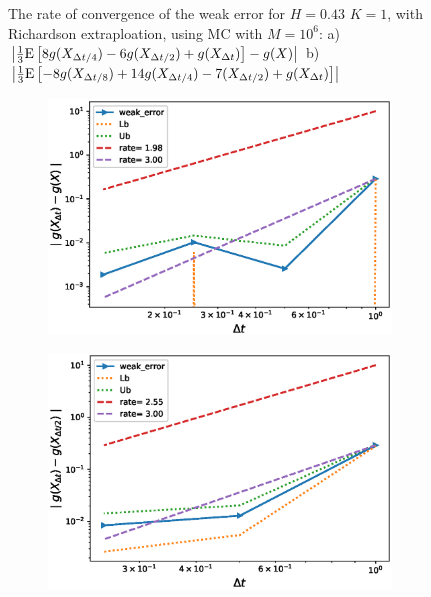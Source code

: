 \documentclass[11pt]{article}
\newcommand{\expt}[1]{\mathrm{E}\left[#1\right]}
\begin{document}
\begin{figure}[h!]
	\caption{The rate of convergence of the weak error for $H=0.43$ $K=1$, with Richardson extraploation, using MC with $M=10^6$: a) $\abs{\frac{1}{3}\expt{8 g(X_{\Delta t/4}) -6g(X_{\Delta t/2}) +g(X_{\Delta t})}-g(X)}$  b) $\abs{\frac{1}{3}\expt{-8 g(X_{\Delta t/8}) +14g(X_{\Delta t/4})-7 (X_{\Delta t/2}) +g(X_{\Delta t})}}$}
	\label{fig:Weak_rate_H_043_with_rich_level2}
\end{figure}

\begin{figure}[h!]
	\centering
	\begin{subfigure}{.4\textwidth}
		\centering
		\includegraphics[width=1\linewidth]{./figures/rBergomi_weak_error_rates/with_richardson/H_007/weak_convergence_order_Bergomi_H_007_K_1_richardson_level2_relative_M_10_6_2}
		\caption{}
		\label{fig:sub3}
	\end{subfigure}%
	\begin{subfigure}{.4\textwidth}
		\centering
		\includegraphics[width=1\linewidth]{./figures/rBergomi_weak_error_rates/with_richardson/H_007/weak_convergence_order_differences_Bergomi_H_007_K_1_richardson_level2_relative_M_10_6_2}
		\caption{}
		\label{fig:sub4}
	\end{subfigure}
	

\end{figure}
\end{document}
